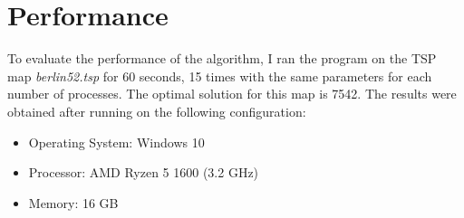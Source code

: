 \newpage
\section{Performance}
To evaluate the performance of the algorithm, I ran the program on the TSP map \emph{berlin52.tsp} for 60 seconds, 15 times with the same parameters for each number of processes. The optimal solution for this map is 7542.
\newline
The results were obtained after running on the following configuration:
\begin{itemize}
    \item Operating System: Windows 10
    \item Processor: AMD Ryzen 5 1600 (3.2 GHz)
    \item Memory: 16 GB
\end{itemize}

